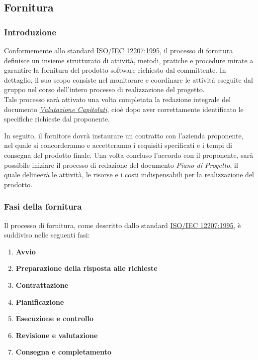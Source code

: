 \subsection{Fornitura}
\subsubsection{Introduzione}
Conformemente allo standard \href{https://www.math.unipd.it/~tullio/IS-1/2009/Approfondimenti/ISO_12207-1995.pdf}{ISO/IEC 12207:1995}, il processo di fornitura definisce un insieme strutturato di attività, metodi, pratiche e procedure mirate a garantire la fornitura del prodotto software richiesto dal committente. 
In dettaglio, il suo scopo consiste nel monitorare e coordinare le attività eseguite dal gruppo nel corso dell'intero processo di realizzazione del progetto.\\
Tale processo sarà attivato una volta completata la redazione integrale del documento \href{https://github.com/ByteOps-swe/Documents/blob/main/Candidatura/Valutazione%20Capitolati.pdf}{\textit{Valutazione Capitolati}}, cioè dopo aver correttamente identificato le specifiche richieste dal proponente.

In seguito, il fornitore dovrà instaurare un contratto con l'azienda proponente, nel quale si concorderanno e accetteranno i requisiti specificati e i tempi di consegna del prodotto finale. Una volta concluso l'accordo con il proponente, sarà possibile iniziare il processo di redazione del documento
\textit{Piano di Progetto}, il quale delineerà le attività, le risorse e i costi indispensabili per la realizzazione del prodotto.

\subsubsection{Fasi della fornitura}
Il processo di fornitura, come descritto dallo standard \href{https://www.math.unipd.it/~tullio/IS-1/2009/Approfondimenti/ISO_12207-1995.pdf}{ISO/IEC 12207:1995}, è suddiviso nelle seguenti fasi:
\begin{enumerate}
    \item \textbf{Avvio}
    \item \textbf{Preparazione della risposta alle richieste}
    \item \textbf{Contrattazione}
    \item \textbf{Pianificazione}
    \item \textbf{Esecuzione e controllo}
    \item \textbf{Revisione e valutazione}
    \item \textbf{Consegna e completamento}
\end{enumerate}

